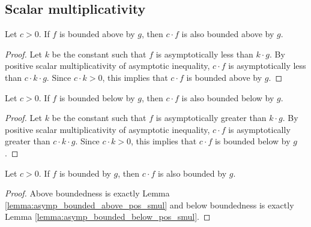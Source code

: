 \subsection{Scalar multiplicativity}

\begin{lemma}
    \label{lemma:asymp_bounded_above_pos_smul}
    \leanok
    Let $c > 0$. If $f$ is bounded above by $g$, then $c \cdot f$ is also bounded
    above by $g$.
\end{lemma}

\begin{proof}
    \leanok
    Let $k$ be the constant such that $f$ is asymptotically less than $k \cdot g$.
    By positive scalar multiplicativity of asymptotic inequality, $c \cdot f$ is 
    asymptotically less than $c \cdot k \cdot g$. Since $c \cdot k > 0$, this implies 
    that $c \cdot f$ is bounded above by $g$.
\end{proof}

\begin{lemma}
    \label{lemma:asymp_bounded_below_pos_smul}
    \leanok
    Let $c > 0$. If $f$ is bounded below by $g$, then $c \cdot f$ is also bounded
    below by $g$.
\end{lemma}

\begin{proof}
    \leanok
    Let $k$ be the constant such that $f$ is asymptotically greater than $k \cdot g$.
    By positive scalar multiplicativity of asymptotic inequality, $c \cdot f$ is 
    asymptotically greater than $c \cdot k \cdot g$. Since $c \cdot k > 0$, this implies
    that $c \cdot f$ is bounded below by $g$.
\end{proof}

\begin{lemma}
    \label{lemma:asymp_bounded_pos_smul}
    \leanok
    Let $c > 0$. If $f$ is bounded by $g$, then $c \cdot f$ is also bounded by $g$.
\end{lemma}

\begin{proof}
    \leanok
    Above boundedness is exactly Lemma \ref{lemma:asymp_bounded_above_pos_smul} and
    below boundedness is exactly Lemma \ref{lemma:asymp_bounded_below_pos_smul}.
\end{proof}

